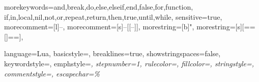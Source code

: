 {
  morekeywords={and,break,do,else,elseif,end,false,for,function,
                if,in,local,nil,not,or,repeat,return,then,true,until,while},
  sensitive=true,
  morecomment=[l]{--},
  morecomment=[s]{--[[}{--]]},
  morestring=[b]{"},
  morestring=[s]{[==[}{]==]},
}

{
  language=Lua,
  basicstyle=\ttfamily,
  breaklines=true,
  showstringspaces=false,
  keywordstyle=\color{Mulberry},
  emphstyle=\itshape,
  stepnumber=1,
  rulecolor=\color{blue!50},
  fillcolor=\color{blue!20},
  stringstyle=\color{BitterSweet},
  commentstyle=\color{BrickRed},
  escapechar=\%
}
